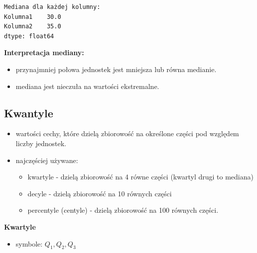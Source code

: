 \documentclass[
  polish,
  letterpaper,
  DIV=11,
  numbers=noendperiod]{scrreprt}
\providecommand{\tightlist}{%
  \setlength{\itemsep}{0pt}\setlength{\parskip}{0pt}}
\begin{document}
\begin{verbatim}
Mediana dla każdej kolumny:
Kolumna1    30.0
Kolumna2    35.0
dtype: float64
\end{verbatim}

\textbf{Interpretacja mediany:}

\begin{itemize}
\tightlist
\item
  przynajmniej połowa jednostek jest mniejsza lub równa medianie.
\item
  mediana jest nieczuła na wartości ekstremalne.
\end{itemize}

\subsection{Kwantyle}\label{kwantyle}

\begin{itemize}
\tightlist
\item
  wartości cechy, które dzielą zbiorowość na określone części pod
  względem liczby jednostek.
\item
  najczęściej używane:

  \begin{itemize}
  \tightlist
  \item
    kwartyle - dzielą zbiorowość na 4 równe części (kwartyl drugi to
    mediana)
  \item
    decyle - dzielą zbiorowość na 10 równych części
  \item
    percentyle (centyle) - dzielą zbiorowość na 100 równych części.
  \end{itemize}
\end{itemize}

\textbf{Kwartyle}

\begin{itemize}
\tightlist
\item
  symbole: \(Q_1, Q_2, Q_3\)
\end{itemize}
\end{document}
